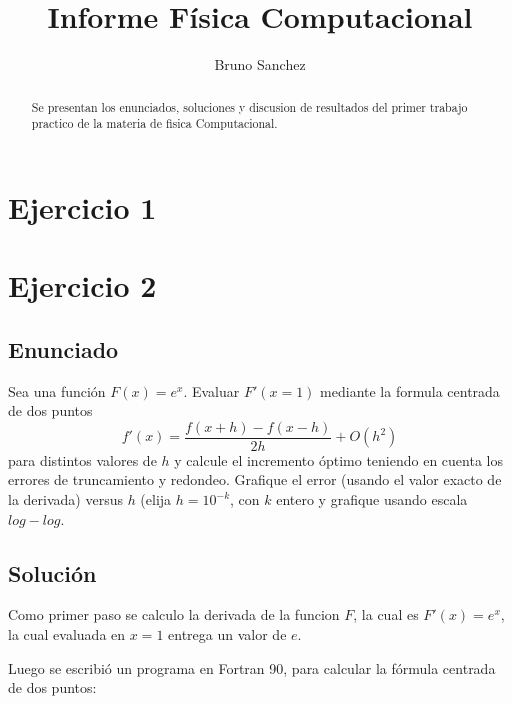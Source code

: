 \documentclass[a4paper,10pt]{report}
\title{Informe F\'isica Computacional }
\author{Bruno Sanchez}
\begin{document}
\maketitle

\begin{abstract}
Se presentan los enunciados, soluciones y discusion de resultados del primer trabajo practico
de la materia de fisica Computacional.
\end{abstract}

\section{Ejercicio 1}

\section{Ejercicio 2}

\subsection{Enunciado}
Sea una funci\'on $F(x) = e^x$. Evaluar $F'(x=1)$ mediante la formula centrada de dos puntos 
 \begin{displaymath}
 f'(x) = \frac{f(x+h) - f(x-h)}{2h} + O(h^2)
 \end{displaymath} 
 para distintos valores de $h$ y calcule el incremento \'optimo teniendo en cuenta los errores de truncamiento y redondeo. 
 Grafique el error (usando el valor exacto de la derivada) versus $h$ (elija $h=10^{-k}$, con $k$ entero y grafique usando
 escala $log-log$.
 
\subsection{Soluci\'on}
Como primer paso se calculo la derivada de la funcion $F$, la cual es $F'(x)=e^x$, la cual evaluada en $x=1$ entrega un
valor de $e$. 

Luego se escribi\'o un programa en Fortran 90, para calcular la f\'ormula centrada de dos puntos:
\inputminted[firstline=22]{fortran}{../2/lab1_2.f90}
\end{document}
